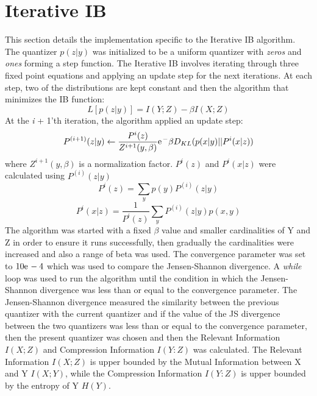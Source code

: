 \section{Iterative IB}
This section details the implementation specific to the Iterative IB algorithm. The quantizer $p(z|y)$ was initialized to be a uniform quantizer with \emph{zeros} and \emph{ones} forming a step function. The Iterative IB involves  iterating through three fixed point equations and applying an update step for the next iterations.  At each step, two of the distributions are kept constant and then the algorithm that minimizes the IB function:
\begin{equation} \label{eq:1}
L[p(z | y)] = I(Y;Z) - \beta I(X;Z)
\end{equation}
At the \emph{i} + 1'th iteration, the algorithm applied an update step:
\begin{equation}
P^{(i+1)}(z|y) \leftarrow \frac{P^i(z)}{Z^{i+1}(y, \beta)}\e^-{\beta D_{KL}(p(x|y)||P^i(x|z))}
\end{equation}
where ${Z^{i+1}(y, \beta)}$ is a normalization factor. $P^i(z)$ and $P^i(x|z)$ were calculated using $P^{(i)}(z|y)$
\begin{equation}
P^i(z) = \sum_y p(y)P^{(i)}(z|y)
\end{equation}
\begin{equation}
P^i(x|z) = \frac{1}{P^i(z)}\sum_y P^{(i)}(z|y) p(x, y)
\end{equation}
The algorithm was started with a fixed $\beta$ value and smaller cardinalities of Y and Z in order to ensure it runs successfully, then gradually the cardinalities were increased and also a range of beta was used.
The  convergence parameter was set to $10\e - 4$ which was used to compare the Jensen-Shannon divergence. A \emph{while} loop was used to run the algorithm until the condition in which the Jensen-Shannon divergence was less than or equal to the convergence parameter. The Jensen-Shannon divergence measured the similarity between the previous quantizer with the current quantizer and if the value of the JS divergence between the two quantizers was less than or equal to the convergence parameter, then the present quantizer was chosen and then the Relevant Information $I(X;Z)$ and Compression Information $I(Y:Z)$ was calculated. The Relevant Information $I(X;Z)$ is upper bounded by the Mutual Information between X and Y $I(X;Y)$, while the Compression Information $I(Y:Z)$ is upper bounded by the entropy of Y $H(Y)$. 
